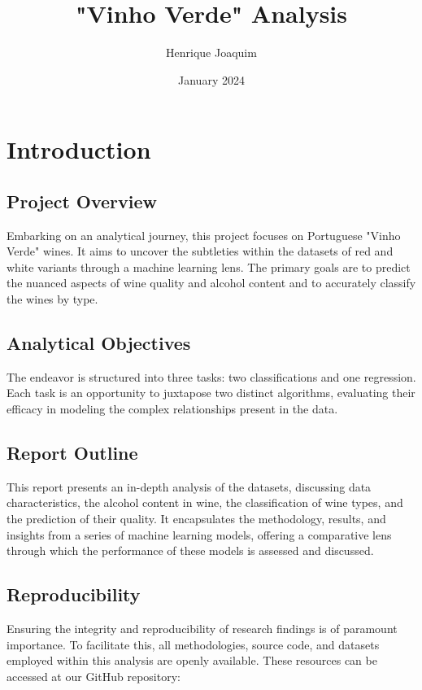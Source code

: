 \documentclass{article}
\title{"Vinho Verde" Analysis}
\author{Henrique Joaquim}
\date{January 2024}
\begin{document}
\maketitle

\section{Introduction}

\subsection{Project Overview}
Embarking on an analytical journey, this project focuses on Portuguese
"Vinho Verde" wines. It aims to uncover the subtleties within the datasets of red and white variants through a machine learning lens. The primary goals are to predict the nuanced aspects of wine quality and alcohol content and to accurately classify the wines by type.

\subsection{Analytical Objectives}
The endeavor is structured into three tasks: two classifications and one regression. Each task is an opportunity to juxtapose two distinct algorithms, evaluating their efficacy in modeling the complex relationships present in the data.

\subsection{Report Outline}
This report presents an in-depth analysis of the datasets, discussing data characteristics, the alcohol content in wine, the classification of wine types, and the prediction of their quality. It encapsulates the methodology, results, and insights from a series of machine learning models, offering a comparative lens through which the performance of these models is assessed and discussed.

\subsection{Reproducibility}

Ensuring the integrity and reproducibility of research findings is of paramount importance. To facilitate this, all methodologies, source code, and datasets employed within this analysis are openly available. These resources can be accessed at our GitHub repository:
\end{document}
